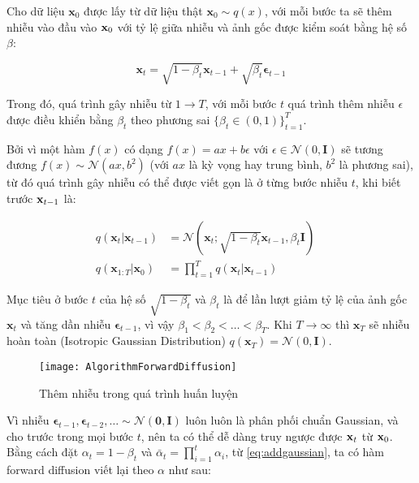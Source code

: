 Cho dữ liệu $\mathbf{x}_{0}$ được lấy từ dữ liệu thật $\mathbf{x}_{0} \sim q(x)$, với mỗi bước ta sẽ thêm nhiễu vào đầu vào $\mathbf{x}_{0}$ với tỷ lệ giữa nhiễu và ảnh gốc được kiểm soát bằng hệ số $\beta$:


\begin{equation}
	\label{eq:addgaussian}
	\mathbf{x}_t = \sqrt{1 - \beta_t}\mathbf{x}_{t-1} + \sqrt{\beta_t} \boldsymbol{\epsilon}_{t-1}
\end{equation}


Trong đó, quá trình gây nhiễu từ $1 \to T$, với mỗi bước $t$ quá trình thêm nhiễu $\epsilon$ được điều khiển bằng $\beta_t$ theo phương sai $\{\beta_t \in (0, 1)\}_{t=1}^T$.

Bởi vì một hàm $f(x)$ có dạng $f(x) = a x + b\epsilon$ với $\epsilon \in \mathcal{N}(0, \mathbf{I})$ sẽ tương đương $f(x) \sim \mathcal{N}(a x, b^2)$ (với $a x$ là kỳ vọng hay trung bình, $b^2$ là phương sai), từ đó quá trình gây nhiễu có thể được viết gọn là ở từng bước nhiễu $t$, khi biết trước $\mathbf{x}_{t-1}$ là:

\begin{equation}
	\label{eq:forward_diffusion_process}
	\begin{aligned}
		q(\mathbf{x}_t \vert \mathbf{x}_{t-1}) &= \mathcal{N}(\mathbf{x}_t; \sqrt{1 - \beta_t} \mathbf{x}_{t-1}, \beta_t\mathbf{I}) \quad \\
		q(\mathbf{x}_{1:T} \vert \mathbf{x}_0) &= \prod^T_{t=1} q(\mathbf{x}_t \vert \mathbf{x}_{t-1})
	\end{aligned}
\end{equation}

Mục tiêu ở bước $t$ của hệ số $\sqrt{1 - \beta_t}$ và $\beta_t$ là để lần lượt giảm tỷ lệ của ảnh gốc $\mathbf{x}_t$ và tăng dần nhiễu  $\boldsymbol{\epsilon}_{t-1}$, vì vậy $\beta_1 < \beta_2 < \dots < \beta_T$. Khi $T \to \infty$ thì $\mathbf{x}_{T}$ sẽ nhiễu hoàn toàn \cite{weng2021diffusion} (Isotropic Gaussian Distribution) $q(\mathbf{x}_{T}) = \mathcal{N} (0, \mathbf{I})$.

\begin{figure}[H]
	\centering
	\texttt{[image: AlgorithmForwardDiffusion]}
	\caption{Thêm nhiễu trong quá trình huấn luyện}
	\label{fig:AlgorithmForwardDiffusion}
\end{figure}

Vì nhiễu $\boldsymbol{\epsilon}_{t-1}, \boldsymbol{\epsilon}_{t-2}, \dots \sim \mathcal{N}(\mathbf{0}, \mathbf{I})$ luôn luôn là phân phối chuẩn Gaussian, và cho trước trong mọi bước $t$, nên ta có thể dễ dàng truy ngược được $\mathbf{x}_t$ từ $\mathbf{x}_0$. Bằng cách đặt $\alpha_t = 1 - \beta_t$ và $\bar{\alpha}_t = \prod_{i=1}^t \alpha_i$, từ \autoref{eq:addgaussian}, ta có hàm forward diffusion viết lại theo $\alpha$ như sau:

